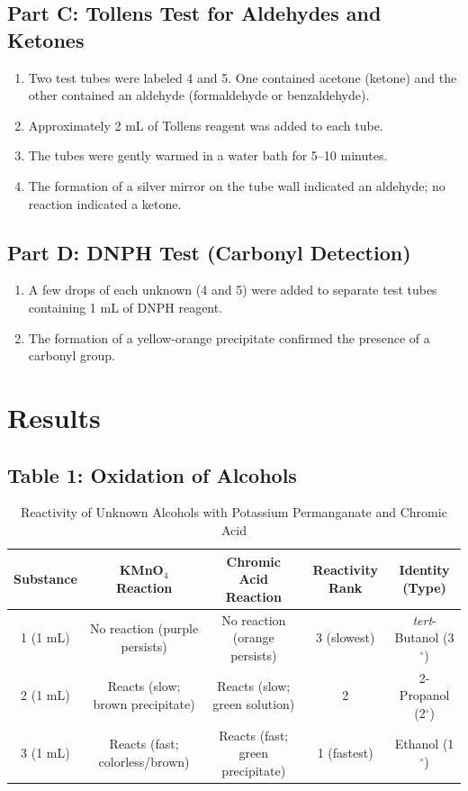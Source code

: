 \documentclass[12pt, a4paper]{article}
\begin{document}
\subsection{Part C: Tollens Test for Aldehydes and Ketones}
\begin{enumerate}
    \item Two test tubes were labeled 4 and 5. One contained acetone (ketone) and the other contained an aldehyde (formaldehyde or benzaldehyde).
    \item Approximately 2 mL of Tollens reagent was added to each tube.
    \item The tubes were gently warmed in a water bath for 5--10 minutes.
    \item The formation of a silver mirror on the tube wall indicated an aldehyde; no reaction indicated a ketone.
\end{enumerate}

\subsection{Part D: DNPH Test (Carbonyl Detection)}
\begin{enumerate}
    \item A few drops of each unknown (4 and 5) were added to separate test tubes containing 1 mL of DNPH reagent.
    \item The formation of a yellow-orange precipitate confirmed the presence of a carbonyl group.
\end{enumerate}

\section{Results}

\subsection{Table 1: Oxidation of Alcohols}

\begin{table}[H]
\centering
\caption{Reactivity of Unknown Alcohols with Potassium Permanganate and Chromic Acid}
\label{tab:alcohols}
\renewcommand{\arraystretch}{1.4}
\begin{tabular}{ccccc}
\toprule
\textbf{Substance} & \textbf{KMnO$_4$ Reaction} & \textbf{Chromic Acid Reaction} & \textbf{Reactivity Rank} & \textbf{Identity (Type)} \\
\midrule
1 (1 mL) & No reaction (purple persists) & No reaction (orange persists) & 3 (slowest) & \textit{tert}-Butanol (3$^\circ$) \\
2 (1 mL) & Reacts (slow; brown precipitate) & Reacts (slow; green solution) & 2 & 2-Propanol (2$^\circ$) \\
3 (1 mL) & Reacts (fast; colorless/brown) & Reacts (fast; green precipitate) & 1 (fastest) & Ethanol (1$^\circ$) \\
\bottomrule
\end{tabular}
\end{table}
\end{document}
